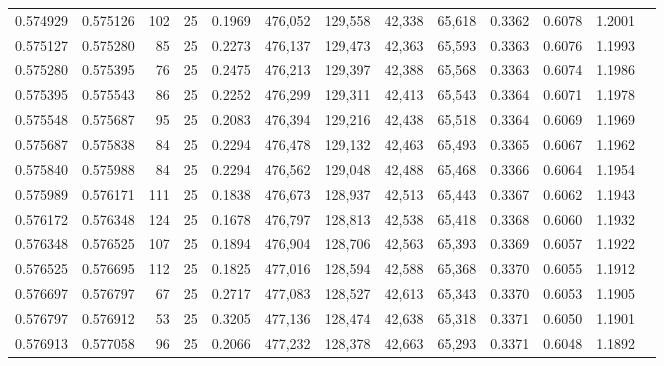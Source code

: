 \begin{tabular}{rrrrrrrrrrrrr}
0.574929 & 0.575126 &   102 &  25 &                                     0.1969 & 476,052 & 129,558 &  42,338 &  65,618 & 0.3362 & 0.6078 & 1.2001 \\
0.575127 & 0.575280 &    85 &  25 &                                     0.2273 & 476,137 & 129,473 &  42,363 &  65,593 & 0.3363 & 0.6076 & 1.1993 \\
0.575280 & 0.575395 &    76 &  25 &                                     0.2475 & 476,213 & 129,397 &  42,388 &  65,568 & 0.3363 & 0.6074 & 1.1986 \\
0.575395 & 0.575543 &    86 &  25 &                                     0.2252 & 476,299 & 129,311 &  42,413 &  65,543 & 0.3364 & 0.6071 & 1.1978 \\
0.575548 & 0.575687 &    95 &  25 &                                     0.2083 & 476,394 & 129,216 &  42,438 &  65,518 & 0.3364 & 0.6069 & 1.1969 \\
0.575687 & 0.575838 &    84 &  25 &                                     0.2294 & 476,478 & 129,132 &  42,463 &  65,493 & 0.3365 & 0.6067 & 1.1962 \\
0.575840 & 0.575988 &    84 &  25 &                                     0.2294 & 476,562 & 129,048 &  42,488 &  65,468 & 0.3366 & 0.6064 & 1.1954 \\
0.575989 & 0.576171 &   111 &  25 &                                     0.1838 & 476,673 & 128,937 &  42,513 &  65,443 & 0.3367 & 0.6062 & 1.1943 \\
0.576172 & 0.576348 &   124 &  25 &                                     0.1678 & 476,797 & 128,813 &  42,538 &  65,418 & 0.3368 & 0.6060 & 1.1932 \\
0.576348 & 0.576525 &   107 &  25 &                                     0.1894 & 476,904 & 128,706 &  42,563 &  65,393 & 0.3369 & 0.6057 & 1.1922 \\
0.576525 & 0.576695 &   112 &  25 &                                     0.1825 & 477,016 & 128,594 &  42,588 &  65,368 & 0.3370 & 0.6055 & 1.1912 \\
0.576697 & 0.576797 &    67 &  25 &                                     0.2717 & 477,083 & 128,527 &  42,613 &  65,343 & 0.3370 & 0.6053 & 1.1905 \\
0.576797 & 0.576912 &    53 &  25 &                                     0.3205 & 477,136 & 128,474 &  42,638 &  65,318 & 0.3371 & 0.6050 & 1.1901 \\
0.576913 & 0.577058 &    96 &  25 &                                     0.2066 & 477,232 & 128,378 &  42,663 &  65,293 & 0.3371 & 0.6048 & 1.1892 \\

\end{tabular}

